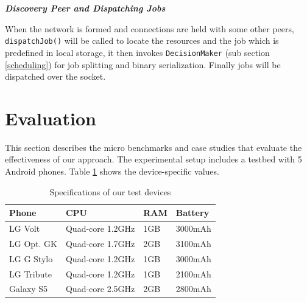 \documentclass{sig-alternate}[10pt]
\begin{document}
\textbf{\emph{Discovery Peer and Dispatching Jobs}}

When the network is formed and connections are held with some other peers, \texttt{dispatchJob()} will be called to locate the resources and the job which is predefined in local storage, it then invokes \texttt{DecisionMaker} (sub section \ref{scheduling}) for job splitting and binary serialization. Finally jobs will be dispatched over the socket.

\begin{figure}
\noindent {}

\end{figure}

\section{Evaluation}
\label{sec:eval}
This section describes the micro benchmarks and case studies that evaluate the effectiveness of our approach. The experimental setup includes a testbed with 5 Android phones. Table \ref{table:devices} shows the device-specific values.

\begin{table}[h]
\caption{Specifications of our test devices}
\label{table:devices}
\centering
\begin{tabular}{| l | l | l | l |}
    \hline
    Phone & CPU & RAM & Battery \\ \hline
    LG Volt & Quad-core 1.2GHz & 1GB & 3000mAh\\ \hline
		LG Opt. GK & Quad-core 1.7GHz & 2GB & 3100mAh\\ \hline
		LG G Stylo & Quad-core 1.2GHz & 1GB & 3000mAh\\ \hline
		LG Tribute & Quad-core 1.2GHz & 1GB & 2100mAh\\ \hline
		Galaxy S5 & Quad-core 2.5GHz & 2GB & 2800mAh\\ \hline
\end{tabular}
\end{table}
\end{document}
